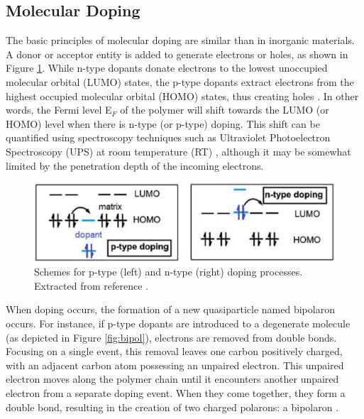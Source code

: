 
\subsection{Molecular Doping} \label{subsec:moldop}
The basic principles of molecular doping are similar than in inorganic materials. A donor or acceptor entity is added to generate electrons or holes, as shown in Figure \ref{fig:dopscheme}. While n-type dopants donate electrons to the lowest unoccupied molecular orbital (LUMO) states, the p-type dopants extract electrons from the highest occupied molecular orbital (HOMO) states, thus creating holes \cite{lussemDopingOrganicSemiconductors2013}. In other words, the Fermi level E$_{F}$ of the polymer will shift towards the LUMO (or HOMO) level when there is n-type (or p-type) doping. This shift can be quantified using spectroscopy techniques such as Ultraviolet Photoelectron Spectroscopy (UPS) at room temperature (RT) \cite{tietzeFermiLevelShift2012}, although it may be somewhat limited by the penetration depth of the incoming electrons.

\begin{figure}[h]
  \centering
  \includegraphics[width=12cm]{Images/pdf/doping.pdf}
  \caption[Scheme of doping processes in organic semiconductors]{Schemes for p-type (left) and n-type (right) doping processes. Extracted from reference \cite{lussemDopingOrganicSemiconductors2013}.}
  \label{fig:dopscheme}
\end{figure}

When doping occurs, %
the formation of a new quasiparticle named bipolaron occurs. For instance, if p-type dopants are introduced to a degenerate molecule (as depicted in Figure \ref{fig:bipol}), electrons are removed from double bonds. Focusing on a single event, this removal leaves one carbon positively charged, with an adjacent carbon atom possessing an unpaired electron. This unpaired electron moves along the polymer chain until it encounters another unpaired electron from a separate doping event. When they come together, they form a double bond, resulting in the creation of two charged polarons: a bipolaron \cite{bredasPolaronsBipolaronsSolitons1985}. %

